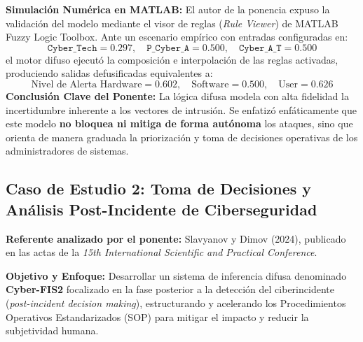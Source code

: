 \documentclass[12pt,a4paper]{article}
\begin{document}
\textbf{Simulación Numérica en MATLAB:} El autor de la ponencia expuso la validación del modelo mediante el visor de reglas (\textit{Rule Viewer}) de MATLAB Fuzzy Logic Toolbox. Ante un escenario empírico con entradas configuradas en:
\begin{equation*}
    \texttt{Cyber\_Tech} = 0.297, \quad \texttt{P\_Cyber\_A} = 0.500, \quad \texttt{Cyber\_A\_T} = 0.500
\end{equation*}
el motor difuso ejecutó la composición e interpolación de las reglas activadas, produciendo salidas defusificadas equivalentes a:
\begin{equation*}
    \text{Nivel de Alerta Hardware} = 0.602, \quad \text{Software} = 0.500, \quad \text{User} = 0.626
\end{equation*}
\textbf{Conclusión Clave del Ponente:} La lógica difusa modela con alta fidelidad la incertidumbre inherente a los vectores de intrusión. Se enfatizó enfáticamente que este modelo \textbf{no bloquea ni mitiga de forma autónoma} los ataques, sino que orienta de manera graduada la priorización y toma de decisiones operativas de los administradores de sistemas.

\subsection*{Caso de Estudio 2: Toma de Decisiones y Análisis Post-Incidente de Ciberseguridad}
\noindent\textbf{Referente analizado por el ponente:} Slavyanov y Dimov (2024), publicado en las actas de la \textit{15th International Scientific and Practical Conference}.

\textbf{Objetivo y Enfoque:} Desarrollar un sistema de inferencia difusa denominado \textbf{Cyber-FIS2} focalizado en la fase posterior a la detección del ciberincidente (\textit{post-incident decision making}), estructurando y acelerando los Procedimientos Operativos Estandarizados (SOP) para mitigar el impacto y reducir la subjetividad humana.
\end{document}
